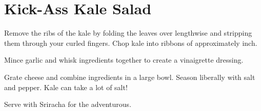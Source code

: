 \section{Kick-Ass Kale Salad}
\begin{recipe}



Remove the ribs of the kale by folding the leaves over lengthwise and stripping them through your curled fingers. Chop kale into ribbons of approximately  inch.


Mince garlic and whisk ingredients together to create a vinaigrette dressing.



Grate cheese and combine ingredients in a large bowl. Season liberally with salt and pepper. Kale can take a lot of salt!

Serve with Sriracha for the adventurous.

\end{recipe}
